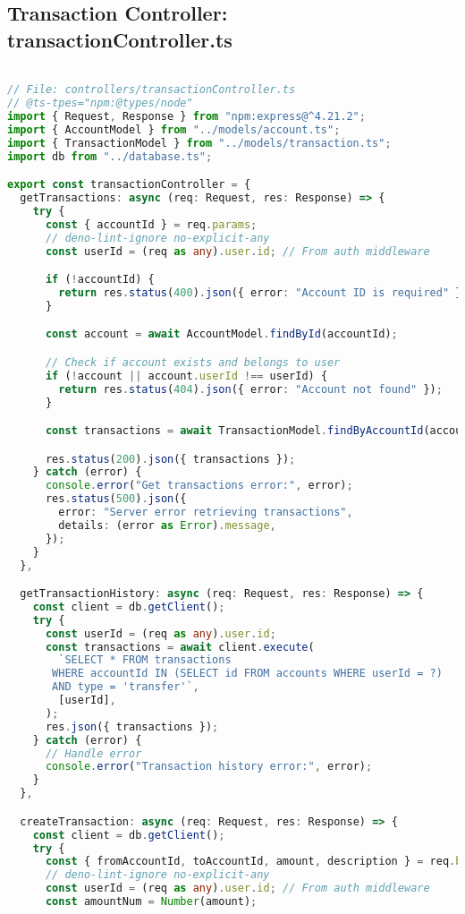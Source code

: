 \subsection{Transaction Controller: transactionController.ts}
\begin{lstlisting}[language=TypeScript]

// File: controllers/transactionController.ts
// @ts-tpes="npm:@types/node"
import { Request, Response } from "npm:express@^4.21.2";
import { AccountModel } from "../models/account.ts";
import { TransactionModel } from "../models/transaction.ts";
import db from "../database.ts";

export const transactionController = {
  getTransactions: async (req: Request, res: Response) => {
    try {
      const { accountId } = req.params;
      // deno-lint-ignore no-explicit-any
      const userId = (req as any).user.id; // From auth middleware

      if (!accountId) {
        return res.status(400).json({ error: "Account ID is required" });
      }

      const account = await AccountModel.findById(accountId);

      // Check if account exists and belongs to user
      if (!account || account.userId !== userId) {
        return res.status(404).json({ error: "Account not found" });
      }

      const transactions = await TransactionModel.findByAccountId(accountId);

      res.status(200).json({ transactions });
    } catch (error) {
      console.error("Get transactions error:", error);
      res.status(500).json({
        error: "Server error retrieving transactions",
        details: (error as Error).message,
      });
    }
  },

  getTransactionHistory: async (req: Request, res: Response) => {
    const client = db.getClient();
    try {
      const userId = (req as any).user.id;
      const transactions = await client.execute(
        `SELECT * FROM transactions
       WHERE accountId IN (SELECT id FROM accounts WHERE userId = ?)
       AND type = 'transfer'`,
        [userId],
      );
      res.json({ transactions });
    } catch (error) {
      // Handle error
      console.error("Transaction history error:", error);
    }
  },

  createTransaction: async (req: Request, res: Response) => {
    const client = db.getClient();
    try {
      const { fromAccountId, toAccountId, amount, description } = req.body;
      // deno-lint-ignore no-explicit-any
      const userId = (req as any).user.id; // From auth middleware
      const amountNum = Number(amount);


\end{lstlisting}
